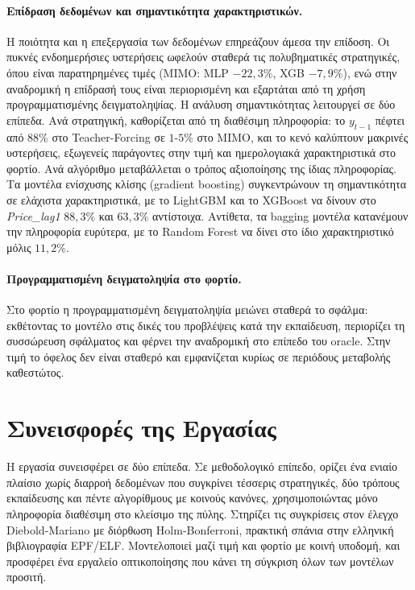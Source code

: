 \paragraph{Επίδραση δεδομένων και σημαντικότητα χαρακτηριστικών.}
Η ποιότητα και η επεξεργασία των δεδομένων επηρεάζουν άμεσα την επίδοση. Οι πυκνές
ενδοημερήσιες υστερήσεις ωφελούν σταθερά τις πολυβηματικές στρατηγικές, όπου είναι
παρατηρημένες τιμές (MIMO: MLP $-22{,}3\%$, XGB $-7{,}9\%$), ενώ στην αναδρομική η επίδρασή
τους είναι περιορισμένη και εξαρτάται από τη χρήση προγραμματισμένης δειγματοληψίας.
Η ανάλυση σημαντικότητας λειτουργεί σε δύο επίπεδα. Ανά στρατηγική, καθορίζεται από τη διαθέσιμη
πληροφορία: το $y_{t-1}$ πέφτει από $88\%$ στο Teacher-Forcing σε $1$-$5\%$ στο MIMO, και
το κενό καλύπτουν μακρινές υστερήσεις, εξωγενείς παράγοντες στην τιμή και ημερολογιακά
χαρακτηριστικά στο φορτίο.
Ανά αλγόριθμο μεταβάλλεται ο τρόπος αξιοποίησης της ίδιας πληροφορίας. Τα μοντέλα ενίσχυσης 
κλίσης (gradient boosting) συγκεντρώνουν τη σημαντικότητα σε ελάχιστα χαρακτηριστικά,
με το LightGBM και το XGBoost να δίνουν στο \textit{Price\_lag1} $88{,}3\%$ και $63{,}3\%$ αντίστοιχα.
Αντίθετα, τα bagging μοντέλα κατανέμουν την πληροφορία ευρύτερα, με το Random Forest να δίνει
στο ίδιο χαρακτηριστικό μόλις $11,2\%$.

\paragraph{Προγραμματισμένη δειγματοληψία στο φορτίο.}
Στο φορτίο η προγραμματισμένη δειγματοληψία μειώνει σταθερά το σφάλμα: εκθέτοντας το μοντέλο
στις δικές του προβλέψεις κατά την εκπαίδευση, περιορίζει τη συσσώρευση σφάλματος και φέρνει
την αναδρομική στο επίπεδο του oracle. Στην τιμή το όφελος δεν είναι σταθερό και εμφανίζεται
κυρίως σε περιόδους μεταβολής καθεστώτος.

\section{Συνεισφορές της Εργασίας}
\label{sec:conc_contributions}

Η εργασία συνεισφέρει σε δύο επίπεδα. Σε μεθοδολογικό επίπεδο, ορίζει ένα ενιαίο πλαίσιο
χωρίς διαρροή δεδομένων που συγκρίνει τέσσερις στρατηγικές, δύο τρόπους εκπαίδευσης και
πέντε αλγορίθμους με κοινούς κανόνες, χρησιμοποιώντας μόνο πληροφορία διαθέσιμη στο κλείσιμο
της πύλης. Στηρίζει τις συγκρίσεις στον έλεγχο Diebold-Mariano με διόρθωση Holm-Bonferroni,
πρακτική σπάνια στην ελληνική βιβλιογραφία EPF/ELF. Μοντελοποιεί μαζί τιμή και φορτίο με κοινή
υποδομή, και προσφέρει ένα εργαλείο οπτικοποίησης που κάνει τη σύγκριση όλων των μοντέλων
προσιτή.


